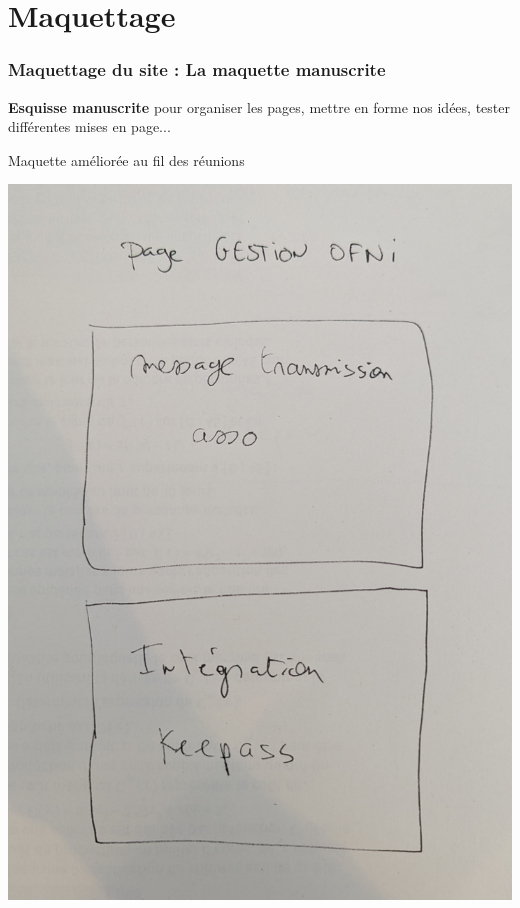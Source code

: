 \section{Maquettage}

\begin{frame}
    \frametitle{Maquettage du site : La maquette manuscrite}

    \begin{minipage}{0.48\textwidth}
        \centering
        \textbf{Esquisse manuscrite} pour organiser les pages, mettre en forme nos idées, tester différentes mises en page...
	\bigskip

	Maquette améliorée au fil des réunions
    \end{minipage}
    \hfill
    \begin{minipage}{0.48\textwidth}
        \centering
        \includegraphics[width=\linewidth]{pictures/maquette.jpg}
    \end{minipage}
\end{frame}

